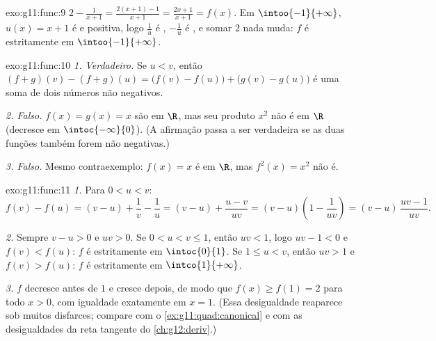 \begin{solution}{exo:g11:func:9}
$2 - \frac{1}{x+1} = \frac{2(x+1) - 1}{x+1} = \frac{2x+1}{x+1} = f(x)$.
Em $\intoo{-1}{+\infty}$, $u(x) = x + 1$ é  e positiva, logo
$\frac1u$ é , $-\frac1u$ é , e somar $2$ nada muda:
$f$ é estritamente  em $\intoo{-1}{+\infty}$.
\end{solution}

\begin{solution}{exo:g11:func:10}
\emph{1. Verdadeiro.} Se $u < v$, então
$(f+g)(v) - (f+g)(u) = \bigl(f(v)-f(u)\bigr) + \bigl(g(v)-g(u)\bigr)$ é
uma soma de dois números não negativos.

\emph{2. Falso.} $f(x) = g(x) = x$ são  em $\R$, mas seu
produto $x^2$ não é  em $\R$ (decresce em
$\intoc{-\infty}{0}$). (A afirmação passa a ser verdadeira se as duas
funções também forem não negativas.)

\emph{3. Falso.} Mesmo contraexemplo: $f(x) = x$ é  em $\R$,
mas $f^2(x) = x^2$ não é.
\end{solution}

\begin{solution}{exo:g11:func:11}
\emph{1.} Para $0 < u < v$:
\[
f(v) - f(u) = (v - u) + \frac1v - \frac1u
= (v - u) + \frac{u - v}{uv}
= (v - u)\left(1 - \frac{1}{uv}\right)
= (v - u)\,\frac{uv - 1}{uv}.
\]

\emph{2.} Sempre $v - u > 0$ e $uv > 0$. Se $0 < u < v \leq 1$, então
$uv < 1$, logo $uv - 1 < 0$ e $f(v) < f(u)$: $f$ é estritamente
 em $\intoc{0}{1}$. Se $1 \leq u < v$, então $uv > 1$ e
$f(v) > f(u)$: $f$ é estritamente  em $\intco{1}{+\infty}$.

\emph{3.} $f$ decresce antes de $1$ e cresce depois, de modo que
$f(x) \geq f(1) = 2$ para todo $x > 0$, com igualdade exatamente em
$x = 1$. (Essa desigualdade reaparece sob muitos disfarces; compare com o
\cref{ex:g11:quad:canonical} e com as desigualdades da reta tangente do
\cref{ch:g12:deriv}.)
\end{solution}

